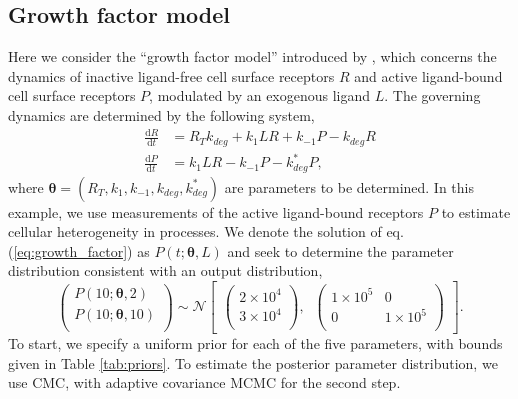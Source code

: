 \documentclass[10pt,letterpaper]{article}
\begin{document}
\subsection{Growth factor model}
Here we consider the ``growth factor model'' introduced by \cite{dixit2018maximum}, which concerns the dynamics of inactive ligand-free cell surface receptors $R$ and active ligand-bound cell surface receptors $P$, modulated by an exogenous ligand $L$. The governing dynamics are determined by the following system,
%
\begin{align}\label{eq:growth_factor}
\frac{\mathrm{d}R}{\mathrm{d}t} &= R_T k_{deg} + k_1 L R + k_{-1} P - k_{deg} R\\
\frac{\mathrm{d}P}{\mathrm{d}t} &= k_1 L R - k_{-1} P - k^*_{deg} P,
\end{align}
%
where $\boldsymbol{\theta}=(R_T, k_1, k_{-1}, k_{deg}, k^*_{deg})$ are parameters to be determined. In this example, we use measurements of the active ligand-bound receptors $P$ to estimate cellular heterogeneity in processes. We denote the solution of eq. (\ref{eq:growth_factor}) as $P(t; \boldsymbol{\theta}, L)$ and seek to determine the parameter distribution consistent with an output distribution,
%
\begin{equation}\label{eq:MM_outputDistribution}
\begin{pmatrix}
P(10; \boldsymbol{\theta}, 2)\\
P(10; \boldsymbol{\theta}, 10)\\
\end{pmatrix} \sim  \mathcal{N}
\begin{bmatrix}
\begin{pmatrix}
2\times 10^4\\
3\times 10^4\\
\end{pmatrix}, \;\;
\begin{pmatrix}
1\times 10^5 & 0\\
0 & 1\times 10^5\\
\end{pmatrix}
\end{bmatrix}.
\end{equation}
%
To start, we specify a uniform prior for each of the five parameters, with bounds given in Table \ref{tab:priors}. To estimate the posterior parameter distribution, we use CMC, with adaptive covariance MCMC \cite{johnstone2016uncertainty} for the second step.
\end{document}
